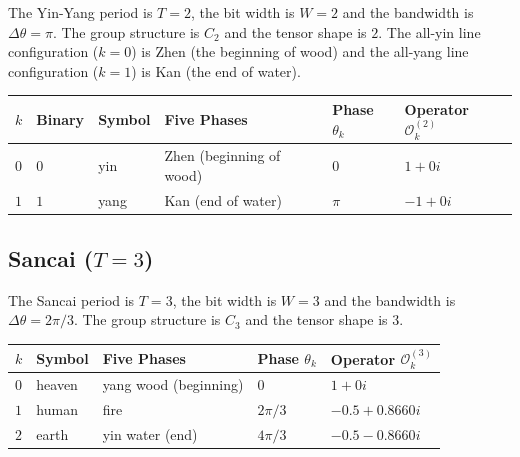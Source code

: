 \begin{definition}\label{def:yinyang_operators}
The Yin-Yang period is $T=2$, the bit width is $W=2$ and the bandwidth is $\Delta\theta=\pi$. The group structure is $C_2$ and the tensor shape is $2$. The all-yin line configuration ($k=0$) is Zhen (the beginning of wood) and the all-yang line configuration ($k=1$) is Kan (the end of water).
\end{definition}

\begin{center}
\begin{tabular}{>{\centering\arraybackslash}p{0.7cm}>{\centering\arraybackslash}p{1.5cm}>{\centering\arraybackslash}p{1.8cm}>{\centering\arraybackslash}p{2.2cm}>{\centering\arraybackslash}p{2.5cm}>{\centering\arraybackslash}p{2.8cm}}
\toprule
$k$ & Binary & Symbol & Five Phases & Phase $\theta_k$ & Operator $\mathcal{O}_k^{(2)}$ \\
\midrule
$0$ & $0$ & yin & Zhen (beginning of wood) & $0$ & $1+0i$ \\
$1$ & $1$ & yang & Kan (end of water) & $\pi$ & $-1+0i$ \\
\bottomrule
\end{tabular}
\end{center}

\subsection{\texorpdfstring{Sancai ($T=3$)}{Sancai (T=3)}}

\begin{definition}\label{def:sancai_operators}
The Sancai period is $T=3$, the bit width is $W=3$ and the bandwidth is $\Delta\theta=2\pi/3$. The group structure is $C_3$ and the tensor shape is $3$.
\end{definition}

\begin{center}
\begin{tabular}{>{\centering\arraybackslash}p{0.8cm}>{\centering\arraybackslash}p{2cm}>{\centering\arraybackslash}p{2.2cm}>{\centering\arraybackslash}p{2.5cm}>{\centering\arraybackslash}p{4cm}}
\toprule
$k$ & Symbol & Five Phases & Phase $\theta_k$ & Operator $\mathcal{O}_k^{(3)}$ \\
\midrule
$0$ & heaven & yang wood (beginning) & $0$ & $1+0i$ \\
$1$ & human & fire & $2\pi/3$ & $-0.5+0.8660i$ \\
$2$ & earth & yin water (end) & $4\pi/3$ & $-0.5-0.8660i$ \\
\bottomrule
\end{tabular}
\end{center}

